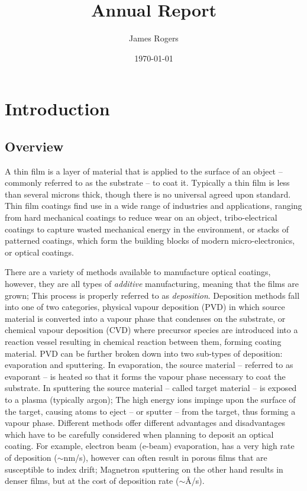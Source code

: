 \documentclass[10pt,a4paper,portrait]{report}
\title{Annual Report}
\author{James Rogers}
\date{\today}
\begin{document}
\maketitle

\chapter{Introduction}
\section{Overview}\label{sec:introduction:overview}
A thin film is a layer of material that is applied to the surface of an object -- commonly referred to as the substrate -- to coat it. Typically a thin film
is less than several microns thick, though there is no universal agreed upon standard.
Thin film coatings find use in a wide range of industries and applications, ranging from hard mechanical coatings to reduce wear on an object, tribo-electrical coatings to capture wasted mechanical energy in the environment, or stacks of patterned coatings, which form the building blocks of modern micro-electronics, or optical coatings. \newline

\noindent
There are a variety of methods available to manufacture optical coatings, however, they are all types of \emph{additive} manufacturing, meaning that the films are grown;
This process is properly referred to as \emph{deposition}.
Deposition methods fall into one of two categories, physical vapour deposition (PVD) in which source material is converted into a vapour phase that condenses on the substrate, or chemical vapour deposition (CVD) where precursor species are introduced into a reaction vessel resulting in chemical reaction between them, forming coating material.
PVD can be further broken down into two sub-types of deposition: evaporation and sputtering.
In evaporation, the source material -- referred to as evaporant -- is heated so that it forms the vapour phase necessary to coat the substrate.
In sputtering the source material -- called target material -- is exposed to a plasma (typically argon);
The high energy ions impinge upon the surface of the target, causing atoms to eject -- or sputter -- from the target, thus forming a vapour phase. Different methods offer different advantages and disadvantages which have to be carefully considered when planning to deposit an optical coating.
For example, electron beam (e-beam) evaporation, has a very high rate of deposition ($\sim$nm/s), however can often result in porous films that are susceptible to index drift;
Magnetron sputtering on the other hand results in denser films, but at the cost of deposition rate ($\sim$\AA/s).\newline
\end{document}
